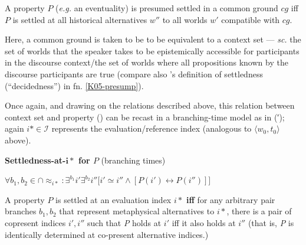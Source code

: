 \documentclass[12pt,dvipsnames]{report}
\begin{document}
A property $P$ (\textit{e.g.} an eventuality) is presumed settled in a common ground $cg$ iff $P$ is settled at all historical alternatives $ w'' $ to all worlds $ w' $ compatible with $ cg $.

Here, a common ground is taken to be to be equivalent to a context set \citep[$ \cap\textit{cg} $, \textit{cf.}][321\textit{ff}]{Stalnaker1978} --- \textit{sc. }the set of worlds that the speaker takes to be epistemically accessible for participants in the discourse context/the set of worlds where all propositions known by the discourse participants are true (compare also \citeauthor{Kaufmann2005}'s definition of settledness (``decidedness'') in fn. \ref{K05-presump}).
\xe

Once again, and drawing on the relations described above, this relation between context set and property () can be recast in a branching-time model as in (′); again $ i*\in\mathcal I $ represents the evaluation/reference index (analogous to $ \langle w_0,t_0\rangle $ above).

\pex[exno=\getref{HistNec}′]\textbf{Settledness-at-$ \boldsymbol{i*} $ for $ \boldsymbol{\mathit P} $} (branching times)





\nobreak$\forall b_1,b_2\in\cap{\approx_{i*}}:\exists^{b_1}i'\exists^{b_2}i''\big[i'\simeq i''\wedge [P(i')\leftrightarrow P(i'')]\big]$

\nobreak A property $ P $ is settled at an evaluation index $ i* $ \textbf{iff} for any arbitrary pair branches $ b_1,b_2 $ that represent metaphysical alternatives to $ i* $, there is a pair of copresent indices $ i',i'' $ such that \textit{P} holds at $ i' $ iff it also holds at $ i'' $ (that is, \textit{P} is identically determined at co-present alternative indices.)
\end{document}
